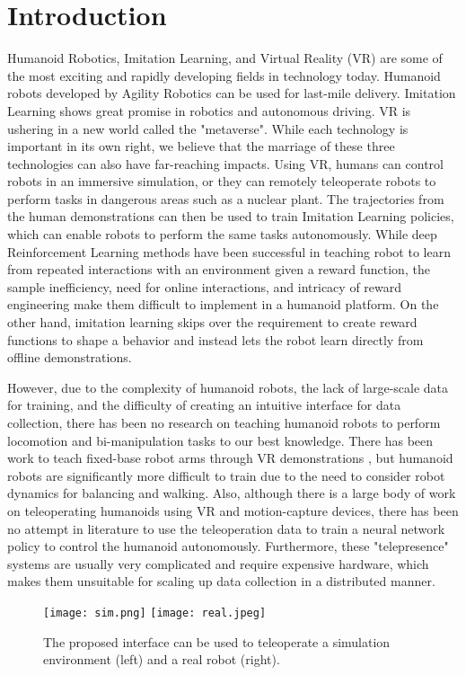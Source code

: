\chapter{Introduction}


Humanoid Robotics, Imitation Learning, and Virtual Reality (VR) are some of the most exciting and rapidly developing fields in technology today. Humanoid robots developed by Agility Robotics can be used for last-mile delivery. Imitation Learning shows great promise in robotics and autonomous driving. VR is ushering in a new world called the "metaverse". While each technology is important in its own right, we believe that the marriage of these three technologies can also have far-reaching impacts. Using VR, humans can control robots in an immersive simulation, or they can remotely teleoperate robots to perform tasks in dangerous areas such as a nuclear plant. The trajectories from the human demonstrations can then be used to train Imitation Learning policies, which can enable robots to perform the same tasks autonomously. While deep Reinforcement Learning methods have been successful in teaching robot to learn from repeated interactions with an environment given a reward function, the sample inefficiency, need for online interactions, and intricacy of reward engineering make them difficult to implement in a humanoid platform. On the other hand, imitation learning skips over the requirement to create reward functions to shape a behavior and instead lets the robot learn directly from offline demonstrations. 

However, due to the complexity of humanoid robots, the lack of large-scale data for training, and the difficulty of creating an intuitive interface for data collection, there has been no research on teaching humanoid robots to perform locomotion and bi-manipulation tasks to our best knowledge. There has been work to teach fixed-base robot arms through VR demonstrations \cite{zhang2018deep}, but humanoid robots are significantly more difficult to train due to the need to consider robot dynamics for balancing and walking. Also, although there is a large body of work on teleoperating humanoids using VR and motion-capture devices, there has been no attempt in literature to use the teleoperation data to train a neural network policy to control the humanoid autonomously. Furthermore, these "telepresence" systems are usually very complicated and require expensive hardware, which makes them unsuitable for scaling up data collection in a distributed manner.

\begin{figure}
	\centering
	\texttt{[image: sim.png]}
	\texttt{[image: real.jpeg]}
	\caption{The proposed interface can be used to teleoperate a simulation environment (left) and a real robot (right).}
    \label{fig:simreal}
\end{figure}

